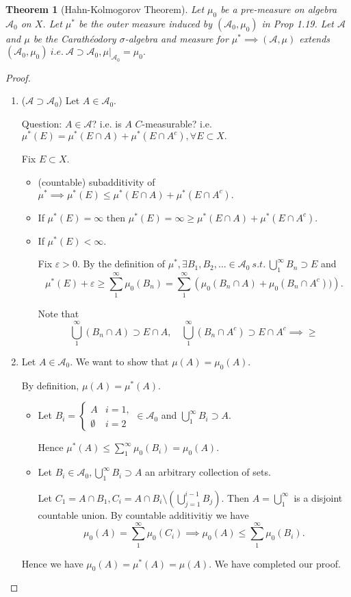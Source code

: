 \documentclass{report}
\newcommand{\st}{\ s.t.\ }
\newcommand{\ie}{\ i.e.\ }
\newtheorem{theorem}{Theorem}[chapter]
\theoremstyle{definition}
\theoremstyle{remark}
\begin{document}
\begin{theorem}[Hahn-Kolmogorov Theorem]
Let $\mu_0$ be a pre-measure on algebra $\mathcal{A}_0$ on $X$. Let $\mu^*$ be the outer measure induced by $(\mathcal{A}_0, \mu_0)$ in Prop 1.19. Let $\mathcal{A}$ and $\mu$ be the Carathéodory $\sigma$-algebra and measure for $\mu^* \implies (\mathcal{A}, \mu)$ extends $(\mathcal{A}_0, \mu_0) \ie \mathcal{A} \supset \mathcal{A}_0, \mu|_{\mathcal{A}_0} = \mu_0.$ 
\end{theorem}
\begin{proof}
\begin{enumerate}
\item ($\mathcal{A} \supset \mathcal{A}_0$)
Let $A \in \mathcal{A}_0$. 

Question: $A \in \mathcal{A}$? i.e. is $A$ $C$-measurable? i.e. $\mu^*(E) = \mu^*(E \cap A) + \mu^*(E \cap A^c), \forall E \subset X.$

Fix $E \subset X.$
\begin{itemize}
\item (countable) subadditivity of $\mu^* \implies \mu^*(E) \leq \mu^*(E \cap A) + \mu^*(E \cap A^c).$
\item If $\mu^*(E) = \infty$ then $\mu^*(E) = \infty \geq \mu^*(E \cap A) + \mu^*(E \cap A^c).$
\item If $\mu^*(E) < \infty.$

Fix $\varepsilon > 0.$ By the definition of $\mu^*, \exists B_1, B_2, \ldots \in \mathcal{A}_0 \st \bigcup_1^\infty B_n \supset E$ and \[\mu^*(E) + \varepsilon \geq \sum_1^\infty \mu_0(B_n) = \sum_1^\infty \left(\mu_0(B_n \cap A) + \mu_0\left(B_n \cap A^c\right))\right).\]

Note that \[
\bigcup_1^\infty (B_n \cap A) \supset E \cap A, \quad \bigcup_1^\infty \left(B_n \cap A^c\right) \supset E \cap A^c \implies \geq
\]
\end{itemize}

\item
Let $A \in \mathcal{A}_0$. We want to show that $\mu(A) = \mu_0(A).$

By definition, $\mu(A) = \mu^*(A).$
\begin{itemize}
\item
Let $B_i = \begin{cases}
A & i = 1, \\
\emptyset & i = 2
\end{cases} \in \mathcal{A}_0$ and $\bigcup_{1}^\infty B_i \supset A.$

Hence $\mu^*(A) \leq \sum_1^\infty \mu_0(B_i) = \mu_0(A).$

\item
Let $B_i \in \mathcal{A}_0, \bigcup_{1}^\infty B_i \supset A$ an arbitrary collection of sets.

Let $C_1 = A \cap B_1, C_i = A \cap B_i \setminus \left(\bigcup_{j=1}^{i-1} B_j\right).$ Then $A = \bigcup_1^\infty$ is a disjoint countable union. By countable additivitiy we have
\[
\mu_0(A) = \sum_1^\infty \mu_0(C_i) \implies \mu_0(A) \leq \sum_1^\infty \mu_0(B_i).
\]
\end{itemize}
Hence we have $\mu_0(A) = \mu^*(A) = \mu(A)$. We have completed our proof. \qedhere
\end{enumerate}
\end{proof}
\end{document}
